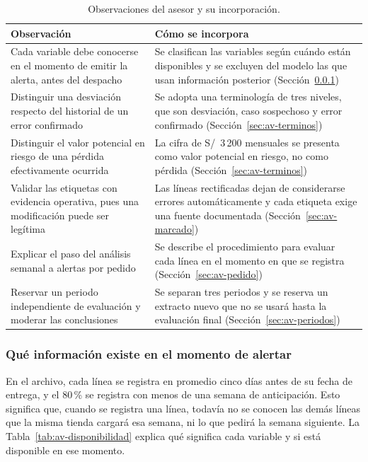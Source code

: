 \iffinal\else
\begin{table}[htbp]
\centering
\caption{Observaciones del asesor y su incorporación.}
\label{tab:av-retro}
\small
\begin{tabularx}{\textwidth}{@{}L{5.2cm}Y@{}}
\toprule
\textbf{Observación} & \textbf{Cómo se incorpora} \\
\midrule
Cada variable debe conocerse en el momento de emitir la alerta, antes del despacho & Se clasifican las variables según cuándo están disponibles y se excluyen del modelo las que usan información posterior (Sección~\ref{sec:av-tiempo}) \\
Distinguir una desviación respecto del historial de un error confirmado & Se adopta una terminología de tres niveles, que son desviación, caso sospechoso y error confirmado (Sección~\ref{sec:av-terminos}) \\
Distinguir el valor potencial en riesgo de una pérdida efectivamente ocurrida & La cifra de S/~3\,200 mensuales se presenta como valor potencial en riesgo, no como pérdida (Sección~\ref{sec:av-terminos}) \\
Validar las etiquetas con evidencia operativa, pues una modificación puede ser legítima & Las líneas rectificadas dejan de considerarse errores automáticamente y cada etiqueta exige una fuente documentada (Sección~\ref{sec:av-marcado}) \\
Explicar el paso del análisis semanal a alertas por pedido & Se describe el procedimiento para evaluar cada línea en el momento en que se registra (Sección~\ref{sec:av-pedido}) \\
Reservar un periodo independiente de evaluación y moderar las conclusiones & Se separan tres periodos y se reserva un extracto nuevo que no se usará hasta la evaluación final (Sección~\ref{sec:av-periodos}) \\
\bottomrule
\end{tabularx}
\end{table}
\fi

\subsubsection{Qué información existe en el momento de alertar}
\label{sec:av-tiempo}

En el archivo, cada línea se registra en promedio cinco días antes de su fecha de entrega, y el 80\,\% se registra con menos de una semana de anticipación. Esto significa que, cuando se registra una línea, todavía no se conocen las demás líneas que la misma tienda cargará esa semana, ni lo que pedirá la semana siguiente. La Tabla~\ref{tab:av-disponibilidad} explica qué significa cada variable y si está disponible en ese momento.

